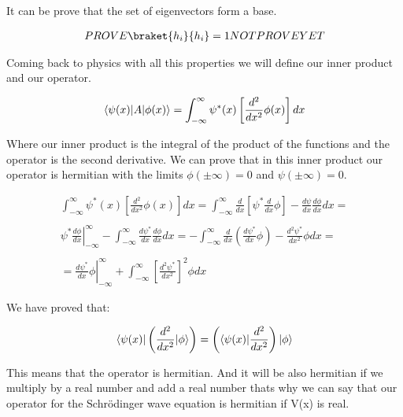 It can be prove that the set of eigenvectors form a base.

\begin{equation}
  \begin{array}{c}
    PROVE \braket{h_i}{h_i} = 1 NOT PROVE YET
  \end{array}
\end{equation}

Coming back to physics with all this properties we will define our inner product and our operator.

\begin{equation}
  \langle\psi(x)\rvert A\lvert\phi(x)\rangle = \int_{-\infty}^{\infty}\psi^*(x)\left[\frac{d^2}{dx^2}\phi(x)\right]dx
\end{equation}

Where our inner product is the integral of the product of the functions and the operator is the second derivative. We can prove that in this inner product our operator is hermitian with the limits $\phi(\pm \infty) = 0$ and $\psi(\pm \infty) = 0$.

\begin{equation}
  \begin{array}{c}
    \int_{-\infty}^{\infty}\psi^*(x)\left[\frac{d^2}{dx^2}\phi(x)\right] dx = \int_{-\infty}^{\infty} \frac{d}{dx}\left[\psi^*\frac{d}{dx}\phi\right]-\frac{d\psi}{dx}\frac{d\phi}{dx} dx =
    \\

    \\
    \left.\psi^*\frac{d\phi}{dx}\right|_{-\infty}^{\infty} - \int_{-\infty}^{\infty} \frac{d\psi^*}{dx}\frac{d\phi}{dx} dx = -\int_{-\infty}^{\infty} \frac{d}{dx}\left(\frac{d\psi^*}{dx}\phi\right)-\frac{d^2\psi^*}{dx^2}\phi dx =
    \\

    \\
    =\left.\frac{d\psi^*}{dx}\phi\right|_{-\infty}^{\infty} + \int_{-\infty}^{\infty} \left[\frac{d^2\psi^*}{dx^2}\right]^2\phi dx
  \end{array}
\end{equation}

We have proved that:

\begin{equation}
  \langle\psi(x)\rvert\left(\frac{d^2}{dx^2}\lvert\phi\rangle\right) = \left(\langle\psi(x)\rvert\frac{d^2}{dx^2}\right)\lvert\phi\rangle
\end{equation}

This means that the operator is hermitian. And it will be also hermitian if we multiply by a real number and add a real number thats why we can say that our operator for the Schrödinger wave equation is hermitian if V(x) is real.

